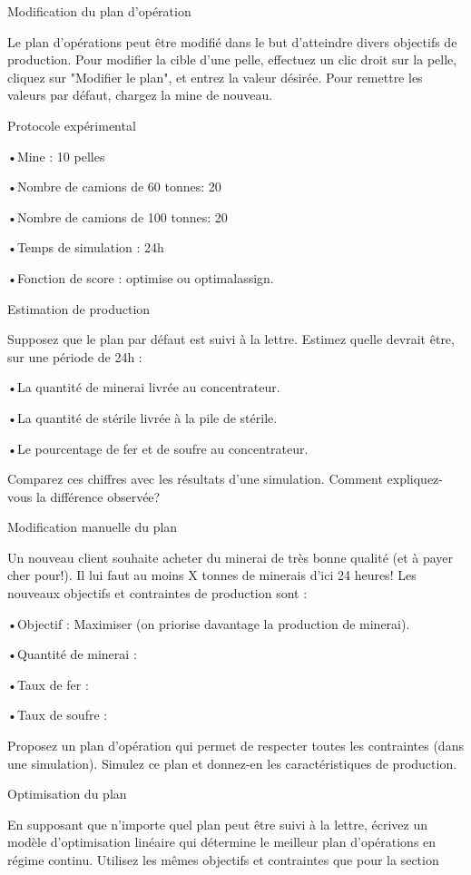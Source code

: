 Modification du plan d'opération

Le plan d'opérations peut être modifié dans le but d'atteindre divers objectifs de production. Pour modifier la cible d'une pelle, effectuez un clic droit sur la pelle, cliquez sur "Modifier le plan", et entrez la valeur désirée. Pour remettre les valeurs par défaut, chargez la mine de nouveau.

Protocole expérimental 

•Mine : 10 pelles

•Nombre de camions de 60 tonnes: 20

•Nombre de camions de 100 tonnes: 20

•Temps de simulation : 24h

•Fonction de score : optimise ou optimalassign.

Estimation de production

Supposez que le plan par défaut est suivi à la lettre. Estimez quelle devrait être, sur une période de 24h : 

•La quantité de minerai livrée au concentrateur.

•La quantité de stérile livrée à la pile de stérile.

•Le pourcentage de fer et de soufre au concentrateur.

Comparez ces chiffres avec les résultats d'une simulation. Comment expliquez-vous la différence observée?

Modification manuelle du plan

Un nouveau client souhaite acheter du minerai de très bonne qualité (et à payer cher pour!). Il lui faut au moins X tonnes de minerais d'ici 24 heures! Les nouveaux objectifs et contraintes de production sont : 

•Objectif : Maximiser (on priorise davantage la production de minerai).

•Quantité de minerai : 

•Taux de fer : 

•Taux de soufre : 

Proposez un plan d'opération qui permet de respecter toutes les contraintes (dans une simulation). Simulez ce plan et donnez-en les caractéristiques de production.

Optimisation du plan

En supposant que n'importe quel plan peut être suivi à la lettre, écrivez un modèle d'optimisation linéaire qui détermine le meilleur plan d'opérations en régime continu. Utilisez les mêmes objectifs et contraintes que pour la section 


